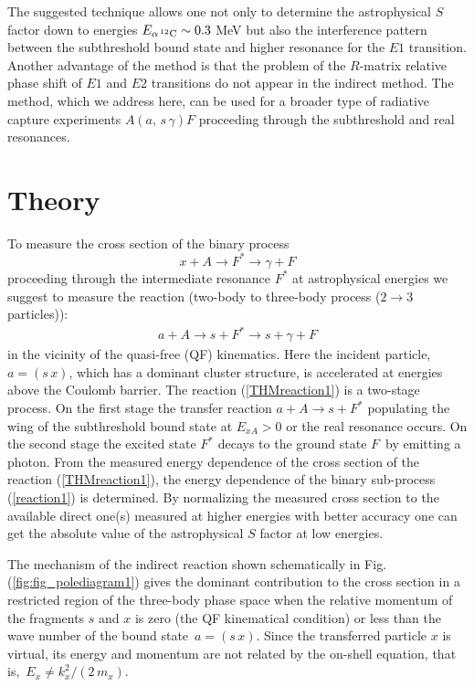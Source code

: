 \documentclass[prl,unsortedaddress,groupedaddress,twocolumn,amsmath,amsfonts,amssymb,showpacs,floatfix,nofootinbib]{revtex4}
\begin{document}
The suggested technique allows one not only to determine the astrophysical $S$ factor down to energies $E_{\alpha\,{}^{12}{\rm C}}  \sim 0.3$ MeV  but also the interference pattern between the subthreshold bound state and higher resonance for the $E1$ transition. Another advantage of the method is that the problem of the $R$-matrix relative phase shift of $E1$ and $E2$ transitions do not appear in the indirect method.
The method, which we address here, can be used for a broader type of radiative capture experiments  $A(a,\,s\,\gamma)F$ proceeding through the subthreshold and real resonances.

\section{Theory}

To measure the cross section of the binary process
\begin{equation}
x + A \to F^{*} \to \gamma +F
\label{reaction1}
\end{equation}
proceeding through the intermediate resonance $F^{*}$  at astrophysical energies we suggest to measure the  reaction (two-body to three-body process ($2 \to 3$ particles)):
\begin{align}
a + A \to s + F^{*} \to s + \gamma + F
\label{THMreaction1}
\end{align}
in the vicinity of the quasi-free (QF) kinematics.
Here the incident particle, $a = (s\,x)$, which has a dominant cluster structure, is accelerated at energies above the Coulomb barrier. The reaction (\ref{THMreaction1}) is a two-stage process.
On the first stage the transfer reaction $a + A \to s+ F^{*}$ populating the wing of the subthreshold bound state at $E_{xA} >0$ or the real resonance  occurs. On the second stage the excited state $F^{*}$ decays to the ground state $F\,$ by emitting a photon. From the measured energy dependence of the cross section of the reaction  (\ref{THMreaction1}), the energy dependence of the binary sub-process (\ref{reaction1}) is determined.  By normalizing the measured cross section to the available direct one(s) measured at higher energies with better accuracy one can get the absolute value of the astrophysical $S$ factor at low energies.

The mechanism of the indirect reaction  shown schematically in Fig. (\ref{fig:fig_polediagram1})  gives the dominant contribution to the cross section in a restricted region of the three-body phase space when the relative momentum of the fragments $s$ and $x$ is zero (the QF kinematical condition) or less than the wave number of the bound state $\,a=(s\,x)$. Since the transferred particle $x$  is virtual, its energy and momentum are not related by the on-shell equation, that is, $\,E_{x}\not= k_{x}^{2}/(2\,m_{x})$.
\end{document}
